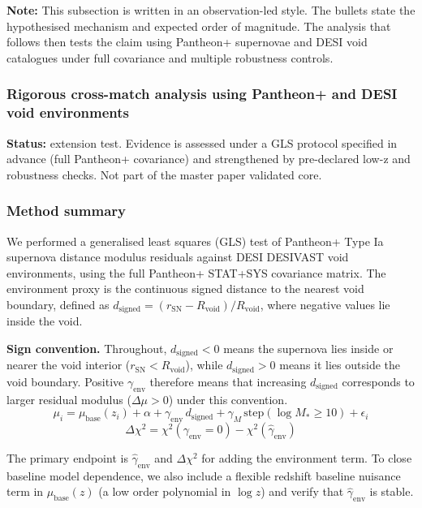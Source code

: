 \documentclass[11pt,a4paper]{article}
\begin{document}
\textbf{Note:} This subsection is written in an observation-led style. The bullets state the hypothesised mechanism and expected order of magnitude. The analysis that follows then tests the claim using Pantheon+ supernovae and DESI void catalogues under full covariance and multiple robustness controls.

\subsubsection{Rigorous cross-match analysis using Pantheon+ and DESI void environments}
\begin{mdframed}[linecolor=accent,linewidth=0.5pt,backgroundcolor=callout-bg,leftline=true,rightline=true,topline=true,bottomline=true,innerleftmargin=8pt,innerrightmargin=8pt,innertopmargin=6pt,innerbottommargin=6pt]
\textbf{Status:} extension test. Evidence is assessed under a GLS protocol specified in advance (full Pantheon+ covariance) and strengthened by pre-declared low-z and robustness checks. Not part of the master paper validated core.
\end{mdframed}

\subsubsection{Method summary}
We performed a generalised least squares (GLS) test of Pantheon+ Type Ia supernova distance modulus residuals against DESI DESIVAST void environments,
using the full Pantheon+ STAT+SYS covariance matrix. The environment proxy is the continuous signed distance to the nearest void boundary,
defined as \(d_{\mathrm{signed}} = (r_{\mathrm{SN}} - R_{\mathrm{void}})/R_{\mathrm{void}}\), where negative values lie inside the void.

\textbf{Sign convention.} Throughout, \(d_{\mathrm{signed}} < 0\) means the supernova lies inside or nearer the void interior (\(r_{\mathrm{SN}} < R_{\mathrm{void}}\)), while \(d_{\mathrm{signed}} > 0\) means it lies outside the void boundary. Positive \(\gamma_{\mathrm{env}}\) therefore means that increasing \(d_{\mathrm{signed}}\) corresponds to larger residual modulus (\(\Delta\mu > 0\)) under this convention.
$$
\mu_i = \mu_{\mathrm{base}}(z_i) + \alpha + \gamma_{\mathrm{env}}\, d_{\mathrm{signed}} + \gamma_M\,\mathrm{step}(\log M_* \ge 10) + \epsilon_i
$$
$$
\Delta \chi^2 = \chi^2(\gamma_{\mathrm{env}} = 0) - \chi^2(\hat\gamma_{\mathrm{env}})
$$

The primary endpoint is \(\hat\gamma_{\mathrm{env}}\) and \(\Delta\chi^2\) for adding the environment term.
To close baseline model dependence, we also include a flexible redshift baseline nuisance term in \(\mu_{\mathrm{base}}(z)\) (a low order polynomial in \(\log z\))
and verify that \(\hat\gamma_{\mathrm{env}}\) is stable.
\end{document}
